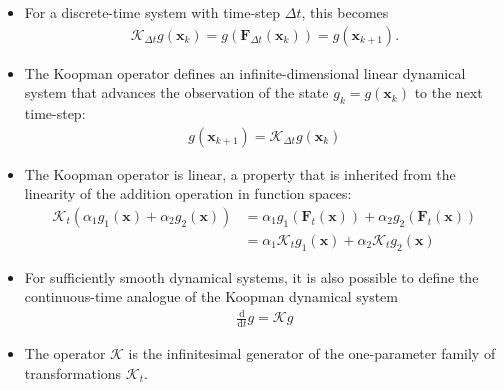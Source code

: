 \documentclass[hyperref={pdfpagemode=FullScreen},aspectratio=169]{beamer}
\begin{document}
\begin{frame}{}
\begin{itemize}
\setlength\itemsep{1em}
\item For a discrete-time system with time-step $\Delta t$, this becomes
\begin{align}
\mathcal{K}_{\Delta t} g(\mathbf{x}_k) = g(\mathbf{F}_{\Delta t}(\mathbf{x}_k)) = g(\mathbf{x}_{k+1}).
\end{align}
\item The Koopman operator defines an infinite-dimensional linear dynamical system that advances the observation of the state $g_k = g(\mathbf{x}_k)$ to the next time-step:
\begin{align}
g(\mathbf{x}_{k+1}) = \mathcal{K}_{\Delta t} g(\mathbf{x}_k)
\end{align}
\item The Koopman operator is linear, a property that is inherited from the linearity of the addition operation in function spaces:
\begin{align}
    \mathcal{K}_t(\alpha_1 g_1(\mathbf{x}) + \alpha_2 g_2(\mathbf{x})) &= \alpha_1 g_1(\mathbf{F}_t(\mathbf{x})) + \alpha_2 g_2(\mathbf{F}_t(\mathbf{x})) \\
    &= \alpha_1 \mathcal{K}_t g_1(\mathbf{x}) + \alpha_2 \mathcal{K}_t g_2(\mathbf{x})
\end{align}
\item For sufficiently smooth dynamical systems, it is also possible to define the continuous-time analogue of the Koopman dynamical system
\begin{align}
\frac{\mathrm{d}}{\mathrm{d}t} g = \mathcal{K} g
\end{align}
\item The operator $\mathcal{K}$ is the infinitesimal generator of the one-parameter family of transformations $\mathcal{K}_t$.
\end{itemize}
\end{frame}
\end{document}
